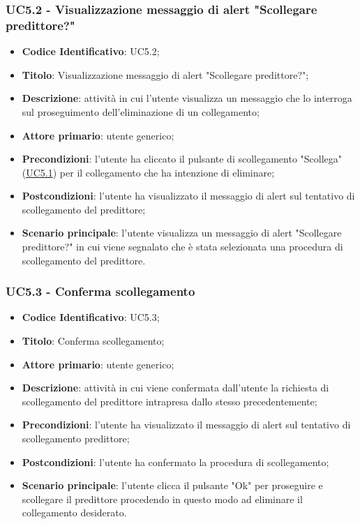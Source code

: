 	\subsubsection{UC5.2 - Visualizzazione messaggio di alert "Scollegare predittore?"}
		\begin{itemize}
			\item\textbf{Codice Identificativo}: UC5.2;
			\item\textbf{Titolo}: Visualizzazione messaggio di alert "Scollegare predittore?";
			\item\textbf{Descrizione}: attività in cui l'utente visualizza un messaggio che lo interroga sul proseguimento dell'eliminazione di un collegamento;
			\item\textbf{Attore primario}: utente generico;
			\item\textbf{Precondizioni}: l'utente ha cliccato il pulsante di scollegamento "Scollega" (\hyperref[par:UC5.1]{UC5.1}) per il collegamento che ha intenzione di eliminare;
			\item\textbf{Postcondizioni}: l'utente ha visualizzato il messaggio di alert sul tentativo di scollegamento del predittore;
					
			\item\textbf{Scenario principale}: l'utente visualizza un messaggio di alert "Scollegare predittore?" in cui viene segnalato che è stata selezionata una procedura di scollegamento del predittore.
	
		\end{itemize}		
		
	\label{par:UC5.3}
	\subsubsection{UC5.3 - Conferma scollegamento}
		\begin{itemize}
			\item\textbf{Codice Identificativo}: UC5.3;
			\item\textbf{Titolo}: Conferma scollegamento;
			\item\textbf{Attore primario}: utente generico;
			\item\textbf{Descrizione}: attività in cui viene confermata dall'utente la richiesta di scollegamento del predittore intrapresa dallo stesso precedentemente;
			\item\textbf{Precondizioni}: l'utente ha visualizzato il messaggio di alert sul tentativo di scollegamento predittore;
			\item\textbf{Postcondizioni}: l'utente ha confermato la procedura di scollegamento;	
			\item\textbf{Scenario principale}: l'utente clicca il pulsante "Ok" per proseguire e scollegare il predittore procedendo in questo modo ad eliminare il collegamento desiderato.
			\end{itemize}
			
